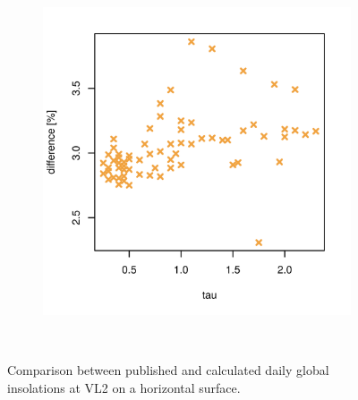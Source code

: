 \begin{figure}[H]
\begin{subfigure}[t]{\subfigureWidth}
            \includegraphics[height=\graphicsHeight]{sections/appendix/A/plots/hh-diff-bet-exp-calc-at-vl2.png}
            \label{fig:sub:comparative-global-insolation-at-vl2-horizontal-percentage-differences}
    \end{subfigure}\\[0.8ex]
    \caption{Comparison between published and calculated daily global insolations at \ac{VL2} on a horizontal surface.}
    \label{fig:plot:comparative-global-insolation-at-vl2-horizontal}
\vspace{-2ex}
\end{figure}
